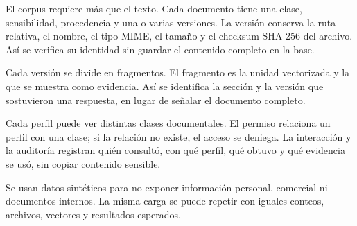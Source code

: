 El corpus requiere más que el texto. Cada documento tiene una clase,
sensibilidad, procedencia y una o varias versiones. La versión conserva la ruta
relativa, el nombre, el tipo MIME, el tamaño y el checksum SHA-256 del archivo.
Así se verifica su identidad sin guardar el contenido completo en la base.

Cada versión se divide en fragmentos. El fragmento es la unidad vectorizada y
la que se muestra como evidencia. Así se identifica la sección y la versión que
sostuvieron una respuesta, en lugar de señalar el documento completo.

Cada perfil puede ver distintas clases documentales. El permiso relaciona un
perfil con una clase; si la relación no existe, el acceso se deniega. La
interacción y la auditoría registran quién consultó, con qué perfil, qué obtuvo
y qué evidencia se usó, sin copiar contenido sensible.

Se usan datos sintéticos para no exponer información personal, comercial ni
documentos internos. La misma carga se puede repetir con iguales conteos,
archivos, vectores y resultados esperados.
